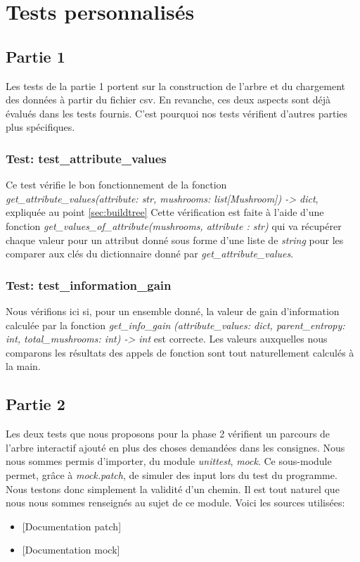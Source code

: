 \documentclass[utf8]{article}
\begin{document}
\section{Tests personnalisés}

\subsection{Partie 1}
Les tests de la partie 1 portent sur la construction de l'arbre et du chargement des données à partir du fichier csv. En revanche, ces deux aspects sont déjà évalués dans les tests fournis. C'est pourquoi nos tests
vérifient d'autres parties plus spécifiques.

\subsubsection{Test: test\_attribute\_values}
Ce test vérifie le bon fonctionnement de la fonction \emph{get\_attribute\_values(attribute: str, mushrooms: list[Mushroom]) -> dict\hfill\break}, expliquée au point \ref{sec:buildtree} 
Cette vérification est faite à l'aide d'une fonction \emph{get\_values\_of\_attribute(mushrooms, attribute : str)} qui va récupérer chaque valeur pour un attribut donné sous forme 
d'une liste de \emph{string} pour les comparer aux clés du dictionnaire donné par \emph{get\_attribute\_values}.

\subsubsection{Test: test\_information\_gain}
Nous vérifions ici si, pour un ensemble donné, la valeur de gain d'information calculée par la fonction \emph{get\_info\_gain}
\emph{(attribute\_values: dict, parent\_entropy: int, total\_mushrooms: int) -> int} est correcte.
Les valeurs auxquelles nous comparons les résultats des appels de fonction sont tout naturellement calculés à la main.

\subsection{Partie 2}
Les deux tests que nous proposons pour la phase 2 vérifient un parcours de l'arbre interactif ajouté en plus des choses demandées dans les consignes. Nous nous sommes permis d'importer, du module \emph{unittest}, \emph{mock}. Ce sous-module
permet, grâce à \emph{mock.patch}, de simuler des input lors du test du programme. Nous testons donc simplement la validité d'un chemin. \newline
Il est tout naturel que nous nous sommes renseignés au sujet de ce module. Voici les sources utilisées:
\begin{itemize}
    \item \href{https://docs.python.org/3/library/unittest.mock.html#patch}[Documentation patch]
    \item \href{https://docs.python.org/3/library/unittest.mock.html#the-mock-class}[Documentation mock]
\end{itemize}
\end{document}
